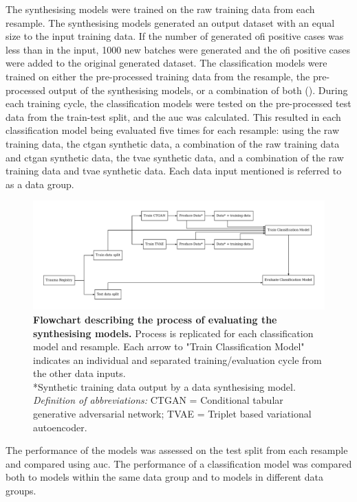 \documentclass[12pt, a4paper]{article}
\begin{document}
The synthesising models were trained on the raw training data from each resample. The synthesising models generated an
output dataset with an equal size to the input training data. If the number of generated \acrshort{ofi} positive cases
was less than in the input, 1000 new batches were generated and the \acrshort{ofi} positive cases were added to the
original generated dataset. The classification models were trained on either the pre-processed training data from the
resample, the pre-processed output of the synthesising models, or a combination of both ().
During each training cycle, the classification models were tested on the pre-processed test data from the train-test
split, and the \acrshort{auc} was calculated. This resulted in each classification model being evaluated five times for
each resample: using the raw training data, the \acrshort{ctgan} synthetic data, a combination of the raw training data
and \acrshort{ctgan} synthetic data, the \acrshort{tvae} synthetic data, and a combination of the raw training data and
\acrshort{tvae} synthetic data. Each data input mentioned is referred to as a data group.

\begin{figure}
	\centering
	\includegraphics[width=\textwidth]{figures/model_flowchart.pdf}
	\caption{\textbf{Flowchart describing the process of evaluating the synthesising models.} Process is replicated for each classification model and resample. Each arrow to "Train Classification Model" indicates an individual and separated training/evaluation cycle from the other data inputs.\\
		*Synthetic training data output by a data synthesising model.\\
		\textit{Definition of abbreviations:} CTGAN = Conditional tabular generative adversarial network; TVAE = Triplet based variational autoencoder.}
	\label{fig:modelflowchart}
\end{figure}

The performance of the models was assessed on the test split from each resample and compared using \acrshort{auc}. The
performance of a classification model was compared both to models within the same data group and to models in different
data groups.
\end{document}
